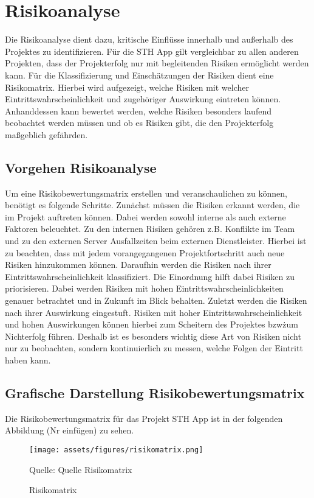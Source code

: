 \chapter{Risikoanalyse}

Die Risikoanalyse dient dazu, kritische Einflüsse innerhalb und außerhalb des Projektes zu identifizieren.
Für die STH App gilt vergleichbar zu allen anderen Projekten, dass der Projekterfolg nur mit begleitenden Risiken ermöglicht werden kann.
Für die Klassifizierung und Einschätzungen der Risiken dient eine Risikomatrix. Hierbei wird aufgezeigt, welche Risiken mit welcher Eintrittswahrscheinlichkeit und zugehöriger Auswirkung eintreten können.
Anhanddessen kann bewertet werden, welche Risiken besonders laufend beobachtet werden müssen und ob es Risiken gibt, die den Projekterfolg maßgeblich gefährden.

\section{Vorgehen Risikoanalyse}
Um eine Risikobewertungsmatrix erstellen und veranschaulichen zu können, benötigt es folgende Schritte.
Zunächst müssen die Risiken erkannt werden, die im Projekt auftreten können.
Dabei werden sowohl interne als auch externe Faktoren beleuchtet.
Zu den internen Risiken gehören z.B. Konflikte im Team und zu den externen Server Ausfallzeiten beim externen Dienstleister.
Hierbei ist zu beachten, dass mit jedem vorangegangenen Projektfortschritt auch neue Risiken hinzukommen können.
Daraufhin werden die Risiken nach ihrer Eintrittswahrscheinlichkeit klassifiziert.
Die Einordnung hilft dabei Risiken zu priorisieren.
Dabei werden Risiken mit hohen Eintrittswahrscheinlichkeiten genauer betrachtet und in Zukunft im Blick behalten.
Zuletzt werden die Risiken nach ihrer Auswirkung eingestuft.
Risiken mit hoher Eintrittswahrscheinlichkeit und hohen Auswirkungen können hierbei zum Scheitern des Projektes bzw\. zum Nichterfolg führen.
Deshalb ist es besonders wichtig diese Art von Risiken nicht nur zu beobachten, sondern kontinuierlich zu messen, welche Folgen der Eintritt haben kann.

\section{Grafische Darstellung Risikobewertungsmatrix}
Die Risikobewertungsmatrix für das Projekt STH App ist in der folgenden Abbildung (Nr einfügen) zu sehen.

\begin{figure}
	\caption[Risikomatrix]{Risikomatrix}
	\centering
	\texttt{[image: assets/figures/risikomatrix.png]}
    \begin{flushleft}
		Quelle: Quelle Risikomatrix
	\end{flushleft}
\end{figure}


